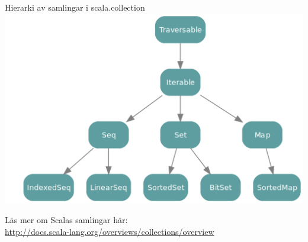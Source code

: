 \fi

\ifkompendium
\begin{Slide}{Hierarki av samlingar i scala.collection}
\includegraphics[width=1.0\textwidth]{../img/collection/collection-traits}
\end{Slide}
\noindent Läs mer om Scalas samlingar här: \\ 
\url{http://docs.scala-lang.org/overviews/collections/overview}
\fi

\ifkompendium\else

